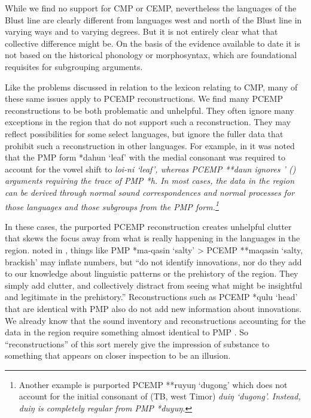While we find no support for CMP or CEMP,
nevertheless the languages  of the Blust line are clearly
different from languages west
and north of the Blust line in varying ways
and to varying degrees.
But it is not entirely clear what that collective difference might be.
On the basis of the evidence available to date it is not based
on the historical phonology or morphosyntax,
which are foundational requisites for subgrouping arguments.

Like the problems discussed in relation to the lexicon relating
to CMP, many of these same issues apply to PCEMP reconstructions.
We find many PCEMP reconstructions to be both problematic and unhelpful.
They often ignore many exceptions in the region that do not support such a reconstruction.
They may reflect possibilities for some select languages,
but ignore the fuller data that prohibit such a reconstruction in other languages.
For example, in  it was noted that the PMP form *dahun
‘leaf’ with the medial consonant was required to account for
the  vowel shift to \it{loi-ni} ‘leaf’,
whereas PCEMP **daun ignores \citeauthor{Collins1983}' (\citeyear[40--52]{Collins1983}) arguments
requiring the trace of PMP *h.
In most cases, the data in the region can be derived through
normal sound correspondences and normal processes for those languages
and those subgroups from the PMP form.\footnote{
		Another example is purported PCEMP **ruyuŋ `dugong'
		which does not account for the initial consonant
		of  (TB, west Timor) \it{duiŋ} `dugong'.
		Instead,  \it{duiŋ}
		is completely regular from PMP *duyuŋ.}

In these cases, the purported PCEMP reconstruction creates unhelpful
clutter that skews the focus away from what is really happening
in the languages in the region.
 noted in \citet{GrimesCIP},
things like PMP *ma-qasin ‘salty’ > PCEMP **maqasin ‘salty,
brackish’ may inflate numbers,
but “do not identify innovations,
nor do they add to our knowledge about linguistic patterns or
the prehistory of the region.
They simply add clutter,
and collectively distract from seeing what might be insightful
and legitimate in the prehistory.” Reconstructions such as PCEMP
*qulu ‘head’ that are identical with PMP also do not add new information about innovations.
We already know that the sound inventory
and reconstructions accounting for the data in the region require
something almost identical to PMP \citep{Grimes1991a}.
So “reconstructions” of this sort merely give the impression
of substance to something that appears on closer inspection to be an illusion.


